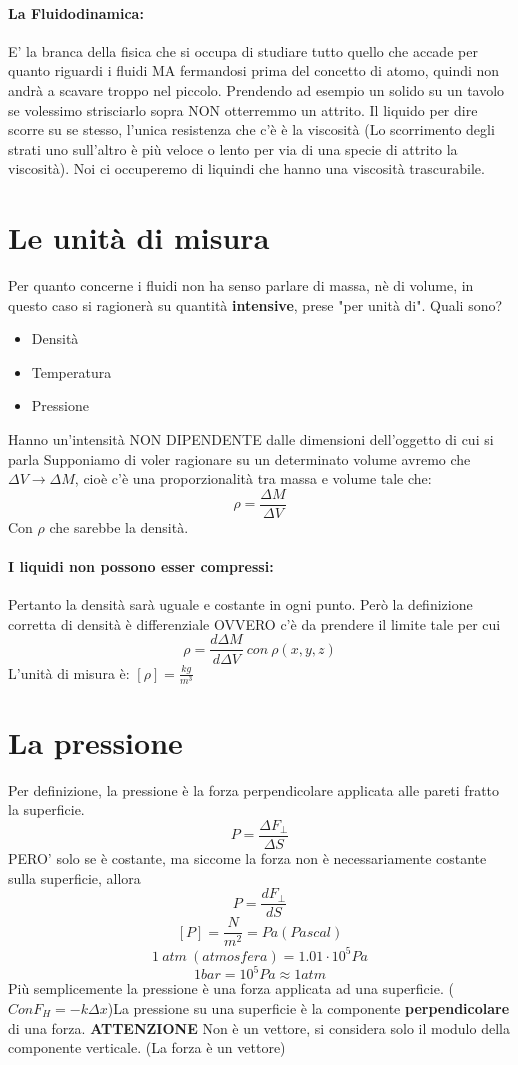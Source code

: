 \documentclass[12pt, a4paper, openany, oneside]{book}
\begin{document}
\paragraph{La Fluidodinamica: }
E' la branca della fisica che si occupa di studiare tutto quello che accade per
quanto riguardi i fluidi MA fermandosi prima del concetto di atomo, quindi non 
andrà a scavare troppo nel piccolo. Prendendo ad esempio un solido su un tavolo
se volessimo strisciarlo sopra NON otterremmo un attrito. Il liquido per dire
scorre su se stesso, l'unica resistenza che c'è è la viscosità (Lo scorrimento
degli strati uno sull'altro è più veloce o lento per via di una specie di attrito
la viscosità). Noi ci occuperemo di liquindi che hanno una viscosità trascurabile.
\section{Le unità di misura}
Per quanto concerne i fluidi non ha senso parlare di massa, nè di volume, in 
questo caso si ragionerà su quantità \textbf{intensive}, prese "per unità di".
Quali sono? 
\begin{itemize}
	\item Densità
	\item Temperatura
	\item Pressione
\end{itemize}
Hanno un'intensità NON DIPENDENTE dalle dimensioni dell'oggetto di cui si parla
Supponiamo di voler ragionare su un determinato volume avremo che $\Delta V \to 
\Delta M$, cioè c'è una proporzionalità tra massa e volume tale che: 
\[
\rho = \frac{\Delta M}{\Delta V}
\]
Con $\rho$ che sarebbe la densità.
\paragraph{I liquidi non possono esser compressi: }Pertanto la densità sarà 
uguale e costante in ogni punto. Però la definizione corretta di densità è 
differenziale OVVERO c'è da prendere il limite tale per cui 
\[
\rho = \frac{d \Delta M}{d \Delta V} ~ con ~ \rho(x, y, z)
\]    
L'unità di misura è: $[\rho] = \frac{kg}{m^{3}}$
\section{La pressione}
Per definizione, la pressione è la forza perpendicolare applicata alle pareti 
fratto la superficie. 
\[
P = \frac{\Delta F_{\perp}}{\Delta S}
\]
PERO' solo se è costante, ma siccome la forza non è necessariamente costante
sulla superficie, allora
\[
P = \frac{dF_{\perp}}{dS}
\]
\[
[P] = \frac{N}{m^{2}} = Pa (Pascal)	
\]	
\[
1 ~ atm ~ (atmosfera) = 1.01 \cdot 10^{5} Pa
\]
\[
1 bar = 10^{5} Pa \approx 1 atm
\]
Più semplicemente la pressione è una forza applicata ad una superficie. ($
Con F_{H} = -k\Delta x $)La pressione su una superficie è la componente \textbf{
perpendicolare
} di una forza. \textbf{ATTENZIONE} Non è un vettore, si considera solo il 
modulo della componente verticale. (La forza è un vettore)
\end{document}
